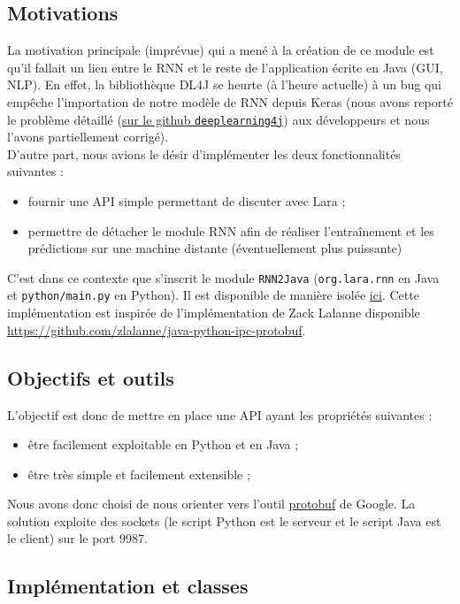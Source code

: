 \documentclass[10pt,a4paper]{article}
\newcommand\tab[1][0.5cm]{\hspace*{#1}}
\begin{document}
\subsection{Motivations}
La motivation principale (imprévue) qui a mené à la création de ce module est qu'il fallait un lien entre le RNN et le reste de l'application écrite en Java (GUI, NLP). En effet, la bibliothèque DL4J se heurte (à l'heure actuelle) à un bug qui empêche l'importation de notre modèle de RNN depuis Keras (nous avons reporté le problème détaillé (\href{https://github.com/eclipse/deeplearning4j/issues/8924}{sur le github \texttt{deeplearning4j}}) aux développeurs et nous l'avons partiellement corrigé). \\
\tab D'autre part, nous avions le désir d'implémenter les deux fonctionnalités suivantes :
\begin{itemize}
	\item fournir une API simple permettant de discuter avec Lara ;
	\item permettre de détacher le module RNN afin de réaliser l'entraînement et les prédictions sur une machine distante (éventuellement plus puissante)
\end{itemize}
C'est dans ce contexte que s'inscrit le module \texttt{RNN2Java} (\texttt{org.lara.rnn} en Java et \texttt{python/main.py} en Python). Il est disponible de manière isolée \href{https://github.com/LaraProject/rnn2java}{ici}. Cette implémentation est inspirée de l'implémentation de Zack Lalanne disponible \href{ici}{https://github.com/zlalanne/java-python-ipc-protobuf}.
\subsection{Objectifs et outils}
L'objectif est donc de mettre en place une API ayant les propriétés suivantes :
\begin{itemize}
	\item être facilement exploitable en Python et en Java ;
	\item être très simple et facilement extensible ;
\end{itemize}
Nous avons donc choisi de nous orienter vers l'outil \href{https://developers.google.com/protocol-buffers}{protobuf} de Google. La solution exploite des sockets (le script Python est le serveur et le script Java est le client) sur le port 9987.
\subsection{Implémentation et classes}
\end{document}
